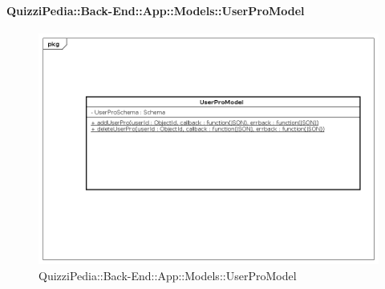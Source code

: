 \paragraph{QuizziPedia::Back-End::App::Models::UserProModel}
\label{QuizziPedia::Back-End::App::Models::UserProModel}
\begin{figure}
	\centering
	\includegraphics[scale=0.45]{UML/Classi/Back-End/QuizziPedia_Back-End_App_Models_userProModel.png}
	\caption{QuizziPedia::Back-End::App::Models::UserProModel}
\end{figure}
\FloatBarrier

